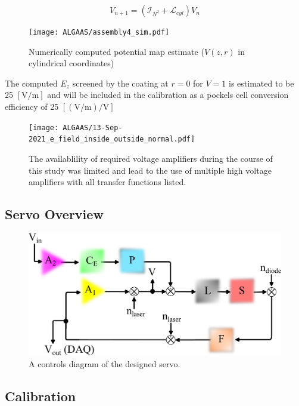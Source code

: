\begin{equation}
    V_{n + 1} = (\mathcal{I}_{N^2}  + \mathcal{L}_{cyl}) V_{n}
\end{equation}

\begin{figure}[H]
  \texttt{[image: ALGAAS/assembly4\_sim.pdf]}
  \caption{Numerically computed potential map estimate ($V(z,r)$ in cylindrical coordinates)}
  \label{fig:poissoncalcoutput}
\end{figure}

The computed $E_z$ screened by the coating at $r = 0$ for $V = 1$ is estimated to be 25 $[\mathrm{V}/\mathrm{m}]$ and will be included in the calibration as a pockels cell conversion efficiency of 25 $[(\mathrm{V} / \mathrm{m}) / \mathrm{V}]$  

\begin{figure}[H]
    \texttt{[image: ALGAAS/13-Sep-2021\_e\_field\_inside\_outside\_normal.pdf]}
    \caption{The availablility of required voltage amplifiers during the course of this study was limited and lead to the use of multiple high voltage amplifiers with all transfer functions listed.}
\label{fig:Ez}
\end{figure}

\subsection{Servo Overview}
\begin{figure}[!ht]
	\includegraphics[width=\textwidth]{figs/ALGAAS/pock_control_diagram.pdf}
	\caption{A controls diagram of the designed servo.}
	\label{fig:pock_control_servo}
\end{figure}

\subsection{Calibration}


